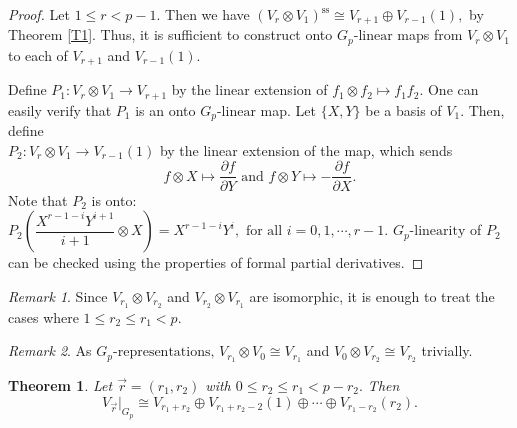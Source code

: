 \documentclass[10pt, reqno]{amsart}
\def\Gp{{G_p}}
\numberwithin{equation}{section}
\newtheorem{theorem}{Theorem}[section] %
\theoremstyle{remark}
\newtheorem{remark}{Remark}
\begin{document}
	\begin{proof}
		Let $1\leq r<p-1.$ Then we have $(V_r\otimes V_1)^{\text{ss}}\cong V_{r+1}\oplus V_{r-1}(1),$ by Theorem \ref{T1}. Thus, it is sufficient to construct onto $\Gp\text{-linear}$ maps from $V_r\otimes V_1$ to each of $V_{r+1}$ and $V_{r-1}(1).$
		
		Define $P_1:V_r\otimes V_1\to V_{r+1}$ by the linear extension of $f_1\otimes f_2\mapsto f_1f_2.$ One can easily verify that $P_1$ is an onto $\Gp\text{-linear}$ map. Let $\{X,Y\}$ be a basis of $V_1$. Then, define \\
		$P_2: V_r\otimes V_1\to V_{r-1}(1)$ by the linear extension of the map, which sends $$f\otimes X\mapsto \dfrac{\partial{f}}{\partial{Y}}\text{ and }f\otimes Y\mapsto -\dfrac{\partial{f}}{\partial{X}}.$$ Note that $P_2$ is onto: $P_2\left(\dfrac{X^{r-1-i}Y^{i+1}}{i+1}\otimes X\right)=X^{r-1-i}Y^{i}, \text{ for all }i=0,1,\cdots,r-1.$ $\Gp\text{-linearity}$ of $P_2$ can be checked using the properties of formal partial derivatives.
	\end{proof}
	
	\begin{remark}\label{R1}
		Since $V_{r_1}\otimes V_{r_2}$ and $V_{r_2}\otimes V_{r_1}$ are isomorphic, it is enough to treat the cases where $1\leq r_2\leq r_1< p.$
	\end{remark}
	
	\begin{remark}\label{R2}
		As $\Gp\text{-representations, } V_{r_1}\otimes V_0\cong V_{r_1}$ and $V_0\otimes V_{r_2}\cong V_{r_2}$ trivially.
	\end{remark}
	
	\begin{theorem}\label{T2}
		Let $\vec{r}=(r_1,r_2)$ with $0\leq r_2\leq r_1< p-r_2.$ Then $${V_{\vec{r}}|}_{\Gp}\cong V_{r_1+r_2}\oplus V_{r_1+r_2-2}(1)\oplus \cdots\oplus V_{r_1-r_2}(r_2).$$
	\end{theorem}
	
\end{document}
